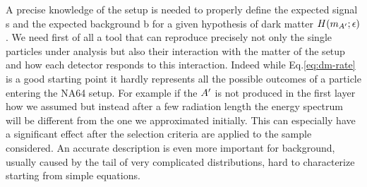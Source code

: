 A precise knowledge of the setup is needed to properly define the expected signal s and the expected background b for a given hypothesis of dark matter $H(m_{A'};\epsilon)$. We need first of all a tool that can reproduce precisely not only the single particles under analysis but also their interaction with the matter of the setup and how each detector responds to this interaction. Indeed while Eq.\ref{eq:dm-rate} is a good starting point it hardly represents all the possible outcomes of a particle entering the NA64 setup. For example if the $A'$ is not produced in the first layer how we assumed but instead after a few radiation length the energy spectrum will be different from the one we approximated initially. This can especially have a significant effect after the selection criteria are applied to the sample considered. An accurate description is even more important for background, usually caused by the tail of very complicated distributions, hard to characterize starting from simple equations.

